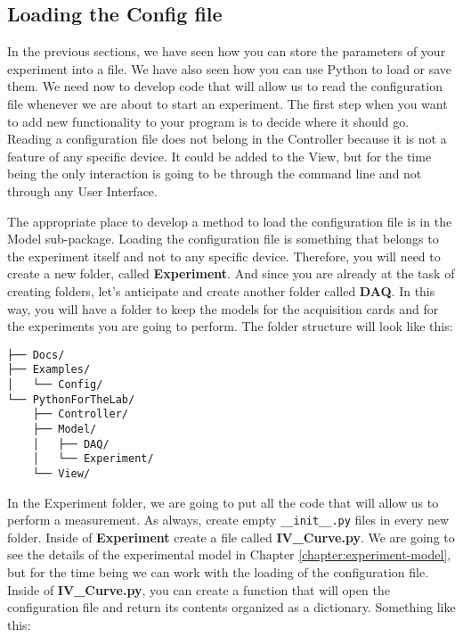 
\subsection{Loading the Config file}\label{subsection:loading-the-config}
In the previous sections, we have seen how you can store the parameters of your experiment into a file. We have also seen how you can use Python to load or save them. We need now to develop code that will allow us to read the configuration file whenever we are about to start an experiment. The first step when you want to add new functionality to your program is to decide where it should go. Reading a configuration file does not belong in the Controller because it is not a feature of any specific device. It could be added to the View, but for the time being the only interaction is going to be through the command line and not through any User Interface. 

The appropriate place to develop a method to load the configuration file is in the Model sub-package. Loading the configuration file is something that belongs to the experiment itself and not to any specific device. Therefore, you will need to create a new folder, called \textbf{Experiment}. And since you are already at the task of creating folders, let's anticipate and create another folder called \textbf{DAQ}. In this way, you will have a folder to keep the models for the acquisition cards and for the experiments you are going to perform. The folder structure will look like this:

\begin{verbatim}
├── Docs/
├── Examples/
│   └── Config/
└── PythonForTheLab/
    ├── Controller/
    ├── Model/
    │   ├── DAQ/
    │   └── Experiment/    
    └── View/
\end{verbatim}

In the Experiment folder, we are going to put all the code that will allow us to perform a measurement. As always, create empty \texttt{\_\_init\_\_.py} files in every new folder. Inside of \textbf{Experiment} create a file called \textbf{IV\_Curve.py}. We are going to see the details of the experimental model in Chapter \ref{chapter:experiment-model}, but for the time being we can work with the loading of the configuration file. Inside of \textbf{IV\_Curve.py}, you can create a function that will open the configuration file and return its contents organized as a dictionary. Something like this:

